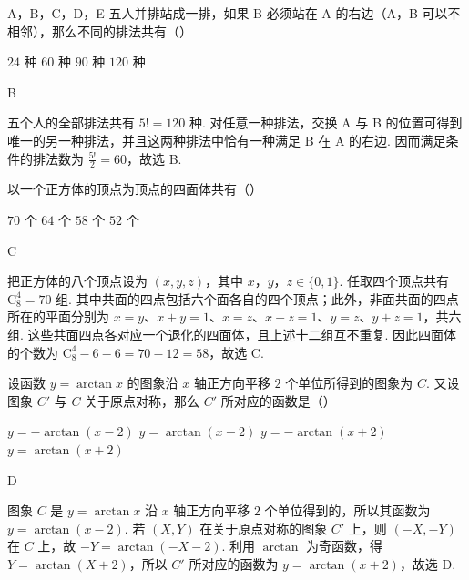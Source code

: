 \documentclass[UTF8,a4paper,oneside,11pt]{ctexbook}
\begin{document}
\begin{problem}
A，B，C，D，E 五人并排站成一排，如果 B 必须站在 A 的右边（A，B 可以不相邻），那么不同的排法共有（\quad）

\choices
    {\(24\text{ 种}\)}
    {\(60\text{ 种}\)}
    {\(90\text{ 种}\)}
    {\(120\text{ 种}\)}

\begin{answer}
B
\end{answer}

\begin{solution}
五个人的全部排法共有 \(5!=120\) 种. 对任意一种排法，交换 A 与 B 的位置可得到唯一的另一种排法，并且这两种排法中恰有一种满足 B 在 A 的右边. 因而满足条件的排法数为 \(\frac{5!}{2}=60\)，故选 B.
\end{solution}
\end{problem}

\begin{problem}
以一个正方体的顶点为顶点的四面体共有（\quad）

\choices
    {\(70\text{ 个}\)}
    {\(64\text{ 个}\)}
    {\(58\text{ 个}\)}
    {\(52\text{ 个}\)}

\begin{answer}
C
\end{answer}

\begin{solution}
把正方体的八个顶点设为 \((x,y,z)\)，其中 \(x\)，\(y\)，\(z\in\{0,1\}\). 任取四个顶点共有 \(\mathrm C_8^4=70\) 组. 其中共面的四点包括六个面各自的四个顶点；此外，非面共面的四点所在的平面分别为 \(x=y\)、\(x+y=1\)、\(x=z\)、\(x+z=1\)、\(y=z\)、\(y+z=1\)，共六组. 这些共面四点各对应一个退化的四面体，且上述十二组互不重复. 因此四面体的个数为 \(\mathrm C_8^4-6-6=70-12=58\)，故选 C.
\end{solution}
\end{problem}

\begin{problem}
设函数 \(y=\arctan x\) 的图象沿 \(x\) 轴正方向平移 \(2\) 个单位所得到的图象为 \(C\). 又设图象 \(C'\) 与 \(C\) 关于原点对称，那么 \(C'\) 所对应的函数是（\quad）

\choices
    {\(y=-\arctan(x-2)\)}
    {\(y=\arctan(x-2)\)}
    {\(y=-\arctan(x+2)\)}
    {\(y=\arctan(x+2)\)}

\begin{answer}
D
\end{answer}

\begin{solution}
图象 \(C\) 是 \(y=\arctan x\) 沿 \(x\) 轴正方向平移 \(2\) 个单位得到的，所以其函数为 \(y=\arctan(x-2)\). 若 \((X,Y)\) 在关于原点对称的图象 \(C'\) 上，则 \((-X,-Y)\) 在 \(C\) 上，故 \(-Y=\arctan(-X-2)\). 利用 \(\arctan\) 为奇函数，得 \(Y=\arctan(X+2)\)，所以 \(C'\) 所对应的函数为 \(y=\arctan(x+2)\)，故选 D.
\end{solution}
\end{problem}
\end{document}
